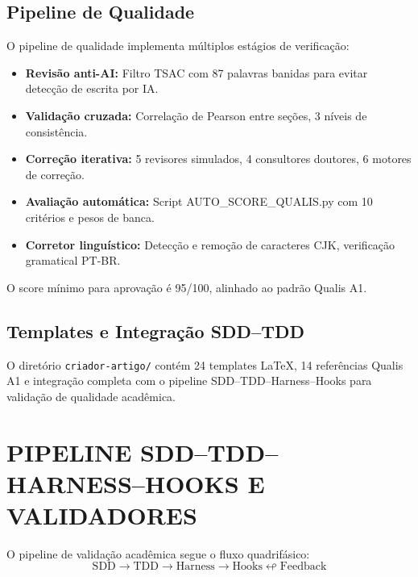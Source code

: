 \documentclass[
  brazil,
  sumario=tradicional,
  10pt
]{abntex2}
\begin{document}
\subsection{Pipeline de Qualidade}

O pipeline de qualidade implementa múltiplos estágios de verificação:

\begin{itemize}
  \item \textbf{Revisão anti-AI:} Filtro TSAC com 87 palavras
    banidas para evitar detecção de escrita por IA.
  \item \textbf{Validação cruzada:} Correlação de Pearson entre
    seções, 3 níveis de consistência.
  \item \textbf{Correção iterativa:} 5 revisores simulados,
    4 consultores doutores, 6 motores de correção.
  \item \textbf{Avaliação automática:} Script
    AUTO\_SCORE\_QUALIS.py com 10 critérios e pesos de banca.
  \item \textbf{Corretor linguístico:} Detecção e remoção de
    caracteres CJK, verificação gramatical PT-BR.
\end{itemize}

O score mínimo para aprovação é 95/100, alinhado ao padrão Qualis A1.

\subsection{Templates e Integração SDD--TDD}

O diretório \texttt{criador-artigo/} contém 24 templates LaTeX, 14
referências Qualis A1 e integração completa com o pipeline
SDD--TDD--Harness--Hooks para validação de qualidade acadêmica.

\section{PIPELINE SDD--TDD--HARNESS--HOOKS E VALIDADORES}
\label{sec:validadores}

O pipeline de validação acadêmica segue o fluxo quadrifásico:
\[
\text{SDD} \longrightarrow \text{TDD} \longrightarrow
\text{Harness} \longrightarrow \text{Hooks}
\looparrowleft \text{Feedback}
\]
\end{document}
